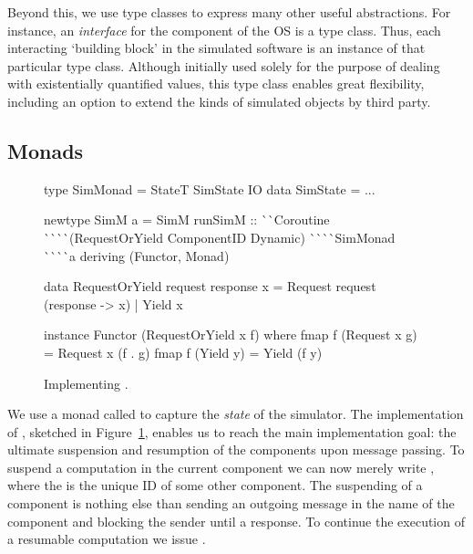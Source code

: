 Beyond this, we use type classes to express many other useful abstractions.
For instance, an \emph{interface} for the component of the OS is a type class.
Thus, each interacting `building block' in the simulated software is an instance of that particular type class.
Although initially used solely for the purpose of dealing with existentially quantified values, this  type class enables great flexibility, including an option to extend the kinds of simulated objects by third party.

\subsection{Monads}
\label{sec:impl-monads}
\begin{figure}[tb]
\begin{code}
type SimMonad  =  StateT SimState IO
data SimState  = ...

newtype SimM a
  = SimM { runSimM ::
      ^^ ^^ Coroutine
      ^^ ^^ ^^ ^^ (RequestOrYield ComponentID Dynamic)
      ^^ ^^ ^^ ^^ SimMonad
      ^^ ^^ ^^ ^^ a 
    } deriving (Functor, Monad)

data RequestOrYield request response x
  =  Request request (response -> x)
  |  Yield   x

instance Functor (RequestOrYield x f) where
  fmap f (Request x g)  = Request x (f . g)
  fmap f (Yield y)      = Yield (f y)
\end{code}
\caption{Implementing .}
\label{fig:code-simm}
\end{figure}


We use a monad called  to capture the \emph{state} of the simulator.
The implementation of \hspace{-1pt}, sketched in Figure~\ref{fig:code-simm}, enables us to reach the main implementation goal: the ultimate suspension and resumption of the components upon message passing.
To suspend a computation in the current component we can now merely write , where the  is the unique ID of some other component.
The suspending of a component is nothing else than sending an outgoing message in the name of the component and blocking the sender until a response.
To continue the execution of a resumable computation we issue  \mbox{.} %


